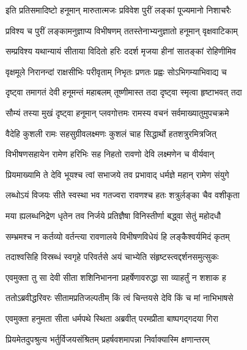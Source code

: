 
\twolineshloka
{इति प्रतिसमादिष्टो हनूमान् मारुतात्मजः}
{प्रविवेश पुरीं लङ्कां पूज्यमानो निशाचरैः} %

\twolineshloka
{प्रविश्य च पुरीं लङ्कामनुज्ञाप्य विभीषणम्}
{ततस्तेनाभ्यनुज्ञातो हनूमान् वृक्षवाटिकाम्} %

\twolineshloka
{सम्प्रविश्य यथान्यायं सीताया विदितो हरिः}
{ददर्श मृजया हीनां सातङ्कां रोहिणीमिव} %

\twolineshloka
{वृक्षमूले निरानन्दां राक्षसीभिः परीवृताम्}
{निभृतः प्रणतः प्रह्वः सोऽभिगम्याभिवाद्य च} %

\twolineshloka
{दृष्ट्वा तमागतं देवी हनूमन्तं महाबलम्}
{तूष्णीमास्त तदा दृष्ट्वा स्मृत्वा हृष्टाभवत् तदा} %

\twolineshloka
{सौम्यं तस्या मुखं दृष्ट्वा हनूमान् प्लवगोत्तमः}
{रामस्य वचनं सर्वमाख्यातुमुपचक्रमे} %

\twolineshloka
{वैदेहि कुशली रामः सहसुग्रीवलक्ष्मणः}
{कुशलं चाह सिद्धार्थो हतशत्रुरमित्रजित्} %

\twolineshloka
{विभीषणसहायेन रामेण हरिभिः सह}
{निहतो रावणो देवि लक्ष्मणेन च वीर्यवान्} %

\twolineshloka
{प्रियमाख्यामि ते देवि भूयश्च त्वां सभाजये}
{तव प्रभावाद् धर्मज्ञे महान् रामेण संयुगे} %

\twolineshloka
{लब्धोऽयं विजयः सीते स्वस्था भव गतज्वरा}
{रावणश्च हतः शत्रुर्लङ्का चैव वशीकृता} %

\twolineshloka
{मया ह्यलब्धनिद्रेण धृतेन तव निर्जये}
{प्रतिज्ञैषा विनिस्तीर्णा बद्ध्वा सेतुं महोदधौ} %

\twolineshloka
{सम्भ्रमश्च न कर्तव्यो वर्तन्त्या रावणालये}
{विभीषणविधेयं हि लङ्कैश्वर्यमिदं कृतम्} %

\twolineshloka
{तदाश्वसिहि विस्रब्धं स्वगृहे परिवर्तसे}
{अयं चाभ्येति संहृष्टस्त्वद्दर्शनसमुत्सुकः} %

\twolineshloka
{एवमुक्ता तु सा देवी सीता शशिनिभानना}
{प्रहर्षेणावरुद्धा सा व्याहर्तुं न शशाक ह} %

\twolineshloka
{ततोऽब्रवीद्धरिवरः सीतामप्रतिजल्पतीम्}
{किं त्वं चिन्तयसे देवि किं च मां नाभिभाषसे} %

\twolineshloka
{एवमुक्ता हनुमता सीता धर्मपथे स्थिता}
{अब्रवीत् परमप्रीता बाष्पगद्गदया गिरा} %

\twolineshloka
{प्रियमेतदुपश्रुत्य भर्तुर्विजयसंश्रितम्}
{प्रहर्षवशमापन्ना निर्वाक्यास्मि क्षणान्तरम्} %

